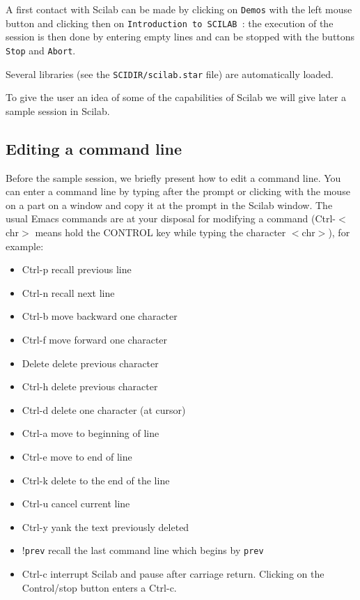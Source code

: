 A first contact with Scilab can be made by clicking 
on {\tt Demos} with the left mouse button and clicking then on 
{\tt Introduction to SCILAB }: the 
execution of the session is then done by entering empty lines and can be
stopped with the buttons {\tt Stop} and {\tt Abort}.

  Several libraries
(see the {\tt SCIDIR/scilab.star} file) are automatically loaded.
        
To give the user an idea of some of the capabilities of Scilab
we will give later a sample session in Scilab.\\

\subsection{Editing a command line}

Before the sample session, we briefly present how to edit a command line.
You can enter a command line by typing after the prompt or clicking with the 
mouse on a part on a window and copy it at the prompt in the Scilab
window. The usual Emacs commands are at your 
disposal for modifying a command (Ctrl-$<$chr$>$  means hold the CONTROL key 
while typing the character $<$chr$>$), for example:

\bigskip


%
\begin{itemize}
\item Ctrl-p    recall previous line
\item Ctrl-n    recall next line
\item Ctrl-b    move backward one character
\item Ctrl-f    move forward one character
\item Delete    delete previous character
\item Ctrl-h    delete previous character
\item Ctrl-d    delete one character (at cursor)
\item Ctrl-a    move to beginning of line
\item Ctrl-e    move to end of line
\item Ctrl-k    delete to the end of the line
\item Ctrl-u    cancel current line
\item Ctrl-y    yank the text previously deleted
\item !{\tt prev}     recall the last command line which begins by {\tt prev}
\item Ctrl-c    interrupt Scilab and pause after carriage return. 
Clicking on the Control/stop button enters a Ctrl-c.
\end{itemize}
%

